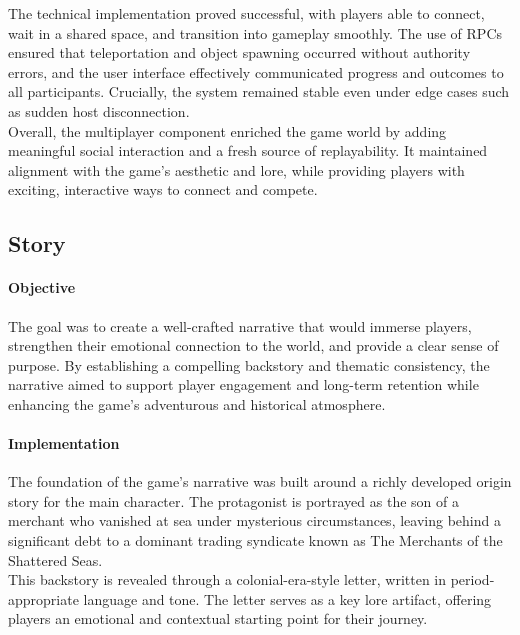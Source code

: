 \documentclass{article}
\begin{document}
The technical implementation proved successful, with players able to connect, wait in a shared space, and transition into gameplay smoothly. The use of RPCs ensured that teleportation and object spawning occurred without authority errors, and the user interface effectively communicated progress and outcomes to all participants. Crucially, the system remained stable even under edge cases such as sudden host disconnection.\\

Overall, the multiplayer component enriched the game world by adding meaningful social interaction and a fresh source of replayability. It maintained alignment with the game's aesthetic and lore, while providing players with exciting, interactive ways to connect and compete.










\newpage
\subsection{Story}
\paragraph{Objective}\hfill

The goal was to create a well-crafted narrative that would immerse players, strengthen their emotional connection to the world, and provide a clear sense of purpose. By establishing a compelling backstory and thematic consistency, the narrative aimed to support player engagement and long-term retention while enhancing the game's adventurous and historical atmosphere.

\paragraph{Implementation}\hfill

The foundation of the game's narrative was built around a richly developed origin story for the main character. The protagonist is portrayed as the son of a merchant who vanished at sea under mysterious circumstances, leaving behind a significant debt to a dominant trading syndicate known as The Merchants of the Shattered Seas.\\

This backstory is revealed through a colonial-era-style letter, written in period-appropriate language and tone. The letter serves as a key lore artifact, offering players an emotional and contextual starting point for their journey.\\
\end{document}
